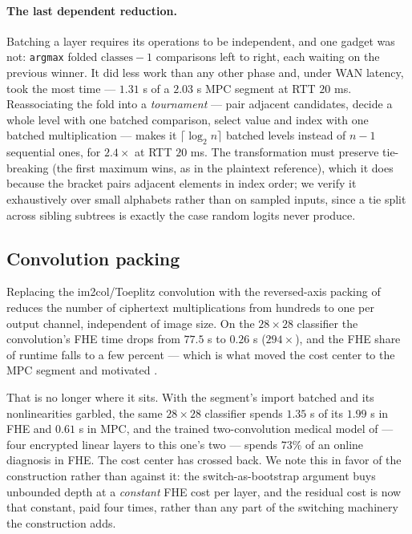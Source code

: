 \documentclass[11pt]{article}
\theoremstyle{plain}
\theoremstyle{definition}
\theoremstyle{remark}
\newcommand{\bt}[1]{\texttt{#1}}
\begin{document}
\paragraph{The last dependent reduction.} Batching a layer requires its
operations to be independent, and one gadget was not: \bt{argmax} folded
$\text{classes}-1$ comparisons left to right, each waiting on the previous
winner. It did less work than any other phase and, under WAN latency,
took the most time --- $1.31$ s of a $2.03$ s MPC segment at RTT $20$ ms.
Reassociating the fold into a \emph{tournament} --- pair adjacent candidates,
decide a whole level with one batched comparison, select value and index with
one batched multiplication --- makes it $\lceil\log_2 n\rceil$ batched levels
instead of $n-1$ sequential ones, for $2.4\times$ at RTT $20$ ms. The
transformation must preserve tie-breaking (the first maximum wins, as in the
plaintext reference), which it does because the bracket pairs adjacent
elements in index order; we verify it exhaustively over small alphabets
rather than on sampled inputs, since a tie split across sibling subtrees is
exactly the case random logits never produce.

\subsection{Convolution packing}

Replacing the im2col/Toeplitz convolution with the reversed-axis packing of
 reduces the number of ciphertext multiplications from
hundreds to one per output channel, independent of image size. On the
$28\times28$ classifier the convolution's FHE time drops from $77.5$ s to
$0.26$ s ($294\times$), and the FHE share of runtime falls to a few percent
--- which is what moved the cost center to the MPC segment and motivated
.

That is no longer where it sits. With the segment's import batched and its
nonlinearities garbled, the same $28\times28$ classifier spends $1.35$ s of
its $1.99$ s in FHE and $0.61$ s in MPC, and the trained two-convolution
medical model of  --- four encrypted linear layers to
this one's two --- spends $73\%$ of an online diagnosis in FHE. The cost center has
crossed back. We note this in favor of the construction rather than against
it: the switch-as-bootstrap argument buys unbounded depth at a
\emph{constant} FHE cost per layer, and the residual cost is now that
constant, paid four times, rather than any part of the switching machinery
the construction adds.
\end{document}
